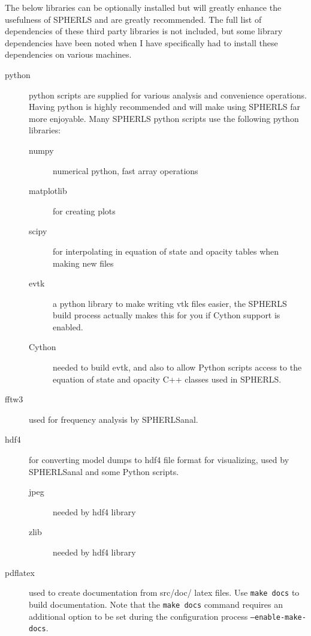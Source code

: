 \documentclass[12pt,a4paper]{book}
\begin{document}
The below libraries can be optionally installed but will greatly enhance the usefulness of SPHERLS and are greatly recommended. The full list of dependencies of these third party libraries is not included, but some library dependencies have been noted when I have specifically had to install these dependencies on various machines.
\begin{description}
\item[python] python scripts are supplied for various analysis and convenience operations. Having python is highly recommended and will make using SPHERLS far more enjoyable. Many SPHERLS python scripts use the following python libraries:
\begin{description}
  \item[numpy] numerical python, fast array operations
  \item[matplotlib] for creating plots
  \item[scipy] for interpolating in equation of state and opacity tables when making new files
  \item[evtk] a python library to make writing vtk files easier, the SPHERLS build process actually makes this for you if Cython support is enabled.
  \item[Cython] needed to build evtk, and also to allow Python scripts access to the equation of state and opacity C++ classes used in SPHERLS.
\end{description}
\item[fftw3] used for frequency analysis by SPHERLSanal.
\item[hdf4] for converting model dumps to hdf4 file format for visualizing, used by SPHERLSanal and some Python scripts.
\begin{description}
  \item[jpeg] needed by hdf4 library
  \item[zlib] needed by hdf4 library
\end{description}
\item[pdflatex] used to create documentation from src/doc/ latex files. Use {\tt make docs} to build documentation. Note that the {\tt make docs} command requires an additional option to be set during the configuration process {\tt --enable-make-docs}.
\end{description}
\end{document}
